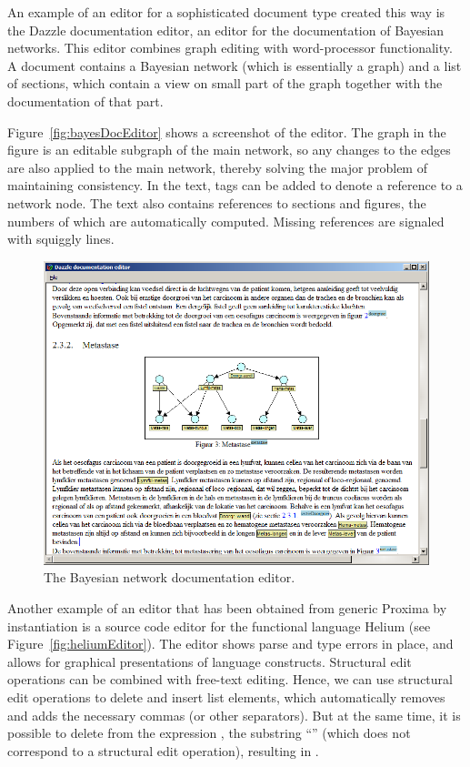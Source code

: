 \documentclass[10pt]{article}
\begin{document}
An example of an editor for a sophisticated document type created this way is the Dazzle documentation editor, an editor for the documentation of Bayesian networks. This editor combines graph editing with word-processor functionality. A document contains a Bayesian network (which is essentially a graph) and a list of sections, which contain a view on small part of the graph together with the documentation of that part. 

Figure~\ref{fig:bayesDocEditor} shows a screenshot of the editor. The graph in the figure is an editable subgraph of the main network, so any changes to the edges are also applied to the main network, thereby solving the major problem of maintaining consistency. In the text, tags can be added to denote a reference to a network node. The text also contains references to sections and figures, the numbers of which are automatically computed. Missing references are signaled with squiggly lines.

\begin{figure}[t]
\includegraphics[width=12cm]{images/subgraph}
\caption{The Bayesian network documentation editor.}
\label{fig:levelsAndLayers}
\end{figure}

Another example of an editor that has been obtained from generic Proxima by instantiation is a source code editor for the functional language Helium (see Figure~\ref{fig:heliumEditor}). The editor shows parse and type errors in place, and allows for graphical presentations of language constructs. Structural edit operations can be combined with free-text editing. Hence, we can use structural edit operations to delete and insert list elements, which automatically removes and adds the necessary commas (or other separators). But at the same time, it is possible to delete from the expression \p{[ 1+2, 3]},  the substring ``'' (which does not correspond to a structural edit operation), resulting in \p{[ 13 ]}.
\end{document}
